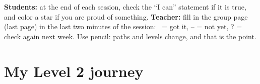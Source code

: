 \documentclass[level=2]{kidscode}
\begin{document}

\begin{tip}
\textbf{Students:} at the end of each session, check the \enquote{I can} statement if it is true,
and color a star if you are proud of something. \textbf{Teacher:} fill in the group page
(last page) in the last two minutes of the session: \checkmark\ = got it, -- = not yet, ? = check
again next week. Use pencil: paths and levels change, and that is the point.
\end{tip}

\section{My Level 2 journey}
\namedateline
\end{document}
